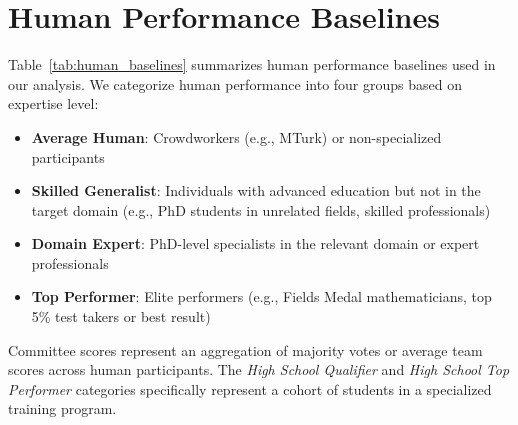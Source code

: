 \documentclass[letterpaper,twocolumn]{article}
\begin{document}

\section{Human Performance Baselines}
\label{app:human_baselines}

Table~\ref{tab:human_baselines} summarizes human performance baselines used in our analysis. We categorize human performance into four groups based on expertise level:

\begin{itemize}
    \item \textbf{Average Human}: Crowdworkers (e.g., MTurk) or non-specialized participants
    \item \textbf{Skilled Generalist}: Individuals with advanced education but not in the target domain (e.g., PhD students in unrelated fields, skilled professionals)
    \item \textbf{Domain Expert}: PhD-level specialists in the relevant domain or expert professionals
    \item \textbf{Top Performer}: Elite performers (e.g., Fields Medal mathematicians, top 5\% test takers or best result)
\end{itemize}

Committee scores represent an aggregation of majority votes or average team scores across human participants. The \textit{High School Qualifier} and \textit{High School Top Performer} categories specifically represent a cohort of students in a specialized training program. 
\end{document}
